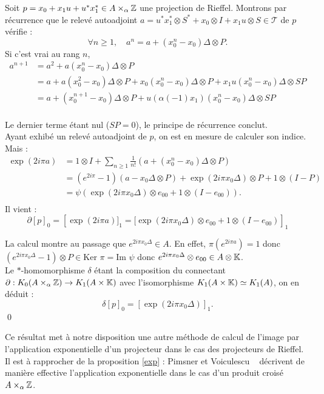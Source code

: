 \begin{dem}
Soit $p=x_0+x_1 u +u^*x_1^*\in A\times_\alpha \mathbb Z $ une projection de Rieffel. Montrons par récurrence que le relevé autoadjoint $a=u^*x_1^*\otimes S^*+x_0\otimes I +x_1 u\otimes S\in \mathcal T$ de $p$ vérifie :
\[\forall n \geq 1, \quad a^n = a+(x_0^n-x_0)\Delta\otimes P.\]
Si c'est vrai au rang $n$,\\
\begin{align*}
a^{n+1} &=a^2+a(x_0^n-x_0)\Delta\otimes P \\
		& =a+a(x_0^2-x_0)\Delta\otimes P+x_0(x_0^n-x_0)\Delta\otimes P+x_1u(x_0^n-x_0)\Delta\otimes SP \\
		& = a+(x_0^{n+1}-x_0)\Delta\otimes P+ u(\alpha(-1)x_1)(x_0^n-x_0)\Delta\otimes SP\\
\end{align*}

Le dernier terme étant nul ($SP=0$), le principe de récurrence conclut.\\

Ayant exhibé un relevé autoadjoint de $p$, on est en mesure de calculer son indice. Mais :
\begin{align*}
\exp(2i\pi a ) &=1\otimes I+\sum_{n\geq 1}\frac{1}{n!}( a+(x_0^n-x_0)\Delta\otimes P)\\
		& = (e^{2i\pi}-1)(a-x_0\Delta \otimes P)+\exp(2i\pi x_0\Delta)\otimes P + 1\otimes (I-P)\\
		& =\psi\left(\exp(2i\pi x_0\Delta)\otimes e_{00} + 1\otimes (I-e_{00})\right).\\
\end{align*}
Il vient : 
\[\partial [p]_0=\left[\exp(2i\pi a )]_1=[\exp(2i\pi x_0\Delta)\otimes e_{00} + 1\otimes (I-e_{00}) \right]_1\]

La calcul montre au passage que $e^{2i\pi x_0 \Delta}\in A$. En effet, $\pi(e^{2i\pi a})= 1$ donc $(e^{2i\pi x_0 \Delta}-1)\otimes P\in \text{Ker }\pi=\text{Im } \psi$ donc $e^{2i\pi x_0 \Delta}\otimes e_{00}\in A\otimes \mathbb K$.\\

Le $*$-homomorphisme $\delta$ étant la composition du connectant $\partial : K_0(A\times_\alpha \mathbb Z)\rightarrow K_1(A\times \mathbb K)$ avec l'isomorphisme $K_1(A\times \mathbb K)\simeq K_1(A)$, on en déduit :
\[\delta[p]_0=[\exp(2i\pi x_0\Delta)]_1.\]
\qed
\end{dem}

Ce résultat met à notre disposition une autre méthode de calcul de l'image par l'application exponentielle d'un projecteur dans le cas des projecteurs de Rieffel. Il est à rapprocher de la proposition \ref{exp} : Pimsner et Voiculescu ~\cite{PV} décrivent de manière effective l'application exponentielle dans le cas d'un produit croisé $A\times _\alpha \mathbb Z$.\\

